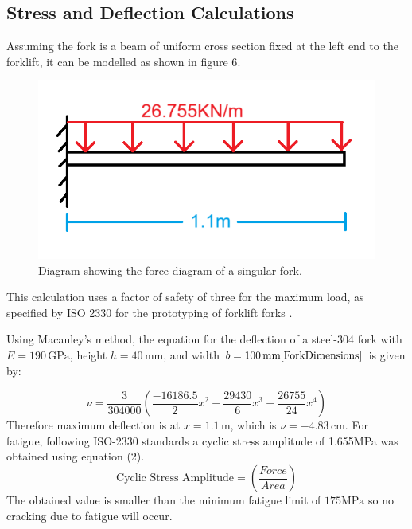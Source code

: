 \documentclass[12pt]{article}
\begin{document}
\subsection {Stress and Deflection Calculations}
Assuming the fork is a beam of uniform cross section fixed at the left end to the forklift, it can be modelled as shown in {figure 6}.
\begin{figure} [H]
    \centering
    \includegraphics[width=0.5\linewidth]{fork as a beam diagram.png}
    \caption{Diagram showing the force diagram of a singular fork.}
    \label{fig:x}
\end{figure}

This calculation uses a factor of safety of three for the maximum load, as specified by ISO 2330 for the prototyping of forklift forks \cite{iso2330}.

Using Macauley's method, the equation for the deflection of a steel-304 fork with \( E = 190 \, \text{GPa} \), height \( h = 40 \, \text{mm} \), and width \( b = 100 \, \text{mm} \cite{ForkDimensions} \) is given by:






\begin{equation}
   \nu = \frac{3}{304000} \left( \frac{-16186.5}{2}x^2 + \frac{29430}{6}x^3 - \frac{26755}{24}x^4 \right)
\end{equation}
Therefore maximum deflection is at \(x = 1.1 \, \text{m}\), which is \(\nu = -4.83 \, \text{cm}\).
For fatigue, following ISO-2330 standards a cyclic stress amplitude of 1.655MPa was obtained using equation (2).
\begin{equation}
   \text{Cyclic Stress Amplitude} = \left (\frac{Force}{Area} \right)
\end{equation}
The obtained value is smaller than the minimum fatigue limit of \(175 \text{MPa}\) so no cracking due to fatigue will occur.
\end{document}
